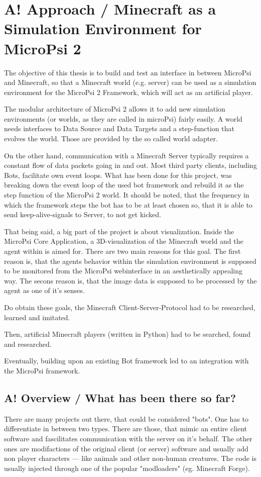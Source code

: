 \chapter{A! Approach / Minecraft as a Simulation Environment for MicroPsi 2}

The objective of this thesis is to build and test an interface in between MicroPsi and Minecraft, so that a Minecraft world (e.g. server) can be used as a simulation environment for the MicroPsi 2 Framework, which will act as an artificial player.

The modular architecture of MicroPsi 2 allows it to add new simulation environments (or worlds, as they are called in microPsi) fairly easily. A world needs interfaces to Data Source and Data Targets and a step-function that evolves the world. Those are provided by the so called world adapter. 

On the other hand, communication with a Minecraft Server typically requires a constant flow of data packets going in and out. Most third party clients, including Bots, facilitate own event loops. What has been done for this project, was breaking down the event loop of the used bot framework and rebuild it as the step function of the MicroPsi 2 world. It should be noted, that the frequency in which the framework steps the bot has to be at least chosen so, that it is able to send keep-alive-signals to Server, to not get kicked.

That being said, a big part of the project is about visualization. Inside the MicroPsi Core Application, a 3D-visualization of the Minecraft world and the agent within is aimed for. There are two main reasons for this goal. The first reason is, that the agents behavior within the simulation environment is supposed to be monitored from the MicroPsi webinterface in an aesthetically appealing way. The secons reason is, that the image data is supposed to be processed by the agent as one of it's senses.

Do obtain these goals, the Minecraft Client-Server-Protocol had to be researched, learned and imitated.

Then, artificial Minecraft players (written in Python) had to be searched, found and researched.

Eventually, building upon an existing Bot framework led to an integration with the MicroPsi framework.

\section{A! Overview / What has been there so far?}
There are many projects out there, that could be considered "bots". One has to differentiate in between two types. There are those, that mimic an entire client software and fascilitates communication with the server on it's behalf. The other ones are modifactions of the original client (or server) software and usually add non player characters --- like animals and other non-human creatures. The code is usually injected through one of the popular "modloaders" (eg. Minecraft Forge).

